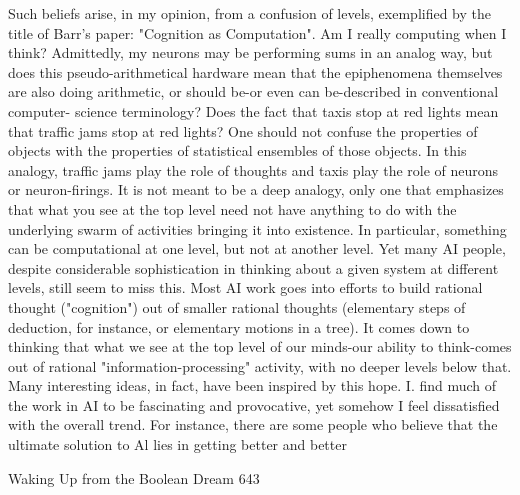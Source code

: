          Such beliefs arise, in my opinion, from a confusion of levels, exemplified by
the title of Barr's paper: "Cognition as Computation". Am I really computing when I
think? Admittedly, my neurons may be performing sums in an analog way, but does
this pseudo-arithmetical hardware mean that the epiphenomena themselves are also
doing arithmetic, or should be-or even can be-described in conventional computer-
science terminology? Does the fact that taxis stop at red lights mean that traffic jams
stop at red lights? One should not confuse the properties of objects with the properties
of statistical ensembles of those objects. In this analogy, traffic jams play the role of
thoughts and taxis play the role of neurons or neuron-firings. It is not meant to be a
deep analogy, only one that emphasizes that what you see at the top level need not
have anything to do with the underlying swarm of activities bringing it into existence.
In particular, something can be computational at one level, but not at another level.
         Yet many AI people, despite considerable sophistication in thinking about a
given system at different levels, still seem to miss this. Most AI work goes into efforts
to build rational thought ("cognition") out of smaller rational thoughts (elementary
steps of deduction, for instance, or elementary motions in a tree). It comes down to
thinking that what we see at the top level of our minds-our ability to think-comes out
of rational "information-processing" activity, with no deeper levels below that.
         Many interesting ideas, in fact, have been inspired by this hope. I. find much
of the work in AI to be fascinating and provocative, yet somehow I feel dissatisfied
with the overall trend. For instance, there are some people who believe that the
ultimate solution to Al lies in getting better and better




Waking Up from the Boolean Dream                                                     643

